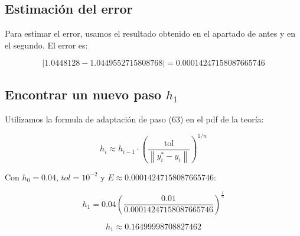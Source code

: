 \documentclass{article}
\begin{document}
\hrulefill
\subsection{Estimación del error}

Para estimar el error, usamos el resultado obtenido en el apartado de antes y en el segundo. El error es:

$$|1.0448128 - 1.0449552715808768| =  0.00014247158087665746 $$

\subsection{Encontrar un nuevo paso $h_1$}

Utilizamos la formula de adaptación de paso (63) en el pdf de la teoría:

$$ h_i \approx h_{i-1} \cdot \left( \frac{\text{tol}}{\left\|y_i^* - y_i\right\|} \right)^{1/n} $$

Con $h_0 = 0.04$, $tol = 10^{-2}$ y $E \approx 0.00014247158087665746$:

$$
h_1 = 0.04 \left( \frac{0.01}{0.00014247158087665746} \right)^{\frac{1}{3}}
$$

$$
h_1 \approx \boxed{0.16499998708827462}
$$
\end{document}
